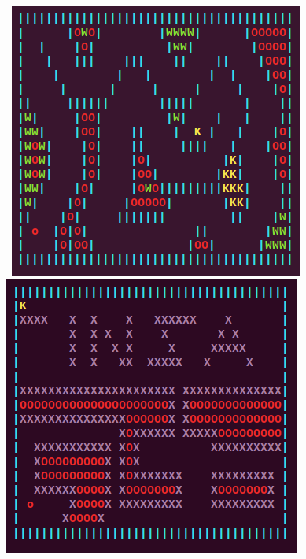 \documentclass[11pt,a4paper]{article}
\begin{document}
         \begin {figure}[htbp]
        \hbox{ 
        \includegraphics[scale=0.6]{./images/stageTitouan.png}
        \hspace*{1cm}  %
        \includegraphics[scale=0.6]{./images/stageAlexO.png}
  }
  \end {figure}
  
\end{document}
